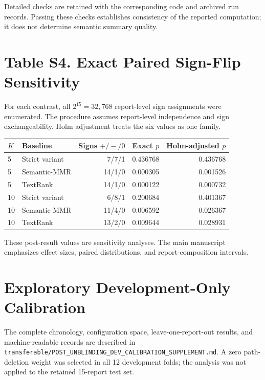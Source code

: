 \documentclass[11pt]{article}
\begin{document}
Detailed checks are retained with the corresponding code and archived run records. Passing these checks establishes consistency of the reported computation; it does not determine semantic summary quality.

\section*{Table S4. Exact Paired Sign-Flip Sensitivity}

For each contrast, all $2^{15}=32{,}768$ report-level sign assignments were enumerated. The procedure assumes report-level independence and sign exchangeability. Holm adjustment treats the six values as one family.

\begin{center}
\small
\begin{tabular}{llrrr}
\toprule
$K$ & Baseline & Signs $+/-/0$ & Exact $p$ & Holm-adjusted $p$\\
\midrule
5 & Strict variant & 7/7/1 & 0.436768 & 0.436768\\
5 & Semantic-MMR & 14/1/0 & 0.000305 & 0.001526\\
5 & TextRank & 14/1/0 & 0.000122 & 0.000732\\
10 & Strict variant & 6/8/1 & 0.200684 & 0.401367\\
10 & Semantic-MMR & 11/4/0 & 0.006592 & 0.026367\\
10 & TextRank & 13/2/0 & 0.009644 & 0.028931\\
\bottomrule
\end{tabular}
\end{center}

These post-result values are sensitivity analyses. The main manuscript emphasizes effect sizes, paired distributions, and report-composition intervals.

\section*{Exploratory Development-Only Calibration}

The complete chronology, configuration space, leave-one-report-out results, and machine-readable records are described in \texttt{transferable/POST\_UNBLINDING\_DEV\_CALIBRATION\_SUPPLEMENT.md}. A zero path-deletion weight was selected in all 12 development folds; the analysis was not applied to the retained 15-report test set.
\end{document}
